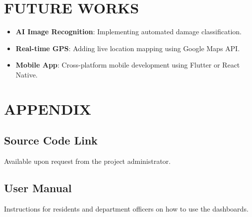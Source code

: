 \chapter{FUTURE WORKS}
\begin{itemize}
    \item \textbf{AI Image Recognition}: Implementing automated damage classification.
    \item \textbf{Real-time GPS}: Adding live location mapping using Google Maps API.
    \item \textbf{Mobile App}: Cross-platform mobile development using Flutter or React Native.
\end{itemize}

\chapter{APPENDIX}
\section{Source Code Link}
Available upon request from the project administrator.
\section{User Manual}
Instructions for residents and department officers on how to use the dashboards.
